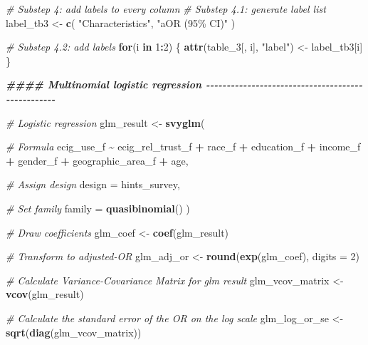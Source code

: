 \documentclass[
]{article}
\newenvironment{Shaded}{\begin{snugshade}}{\end{snugshade}}
\newcommand{\AttributeTok}[1]{\textcolor[rgb]{0.13,0.29,0.53}{#1}}
\newcommand{\CommentTok}[1]{\textcolor[rgb]{0.56,0.35,0.01}{\textit{#1}}}
\newcommand{\ControlFlowTok}[1]{\textcolor[rgb]{0.13,0.29,0.53}{\textbf{#1}}}
\newcommand{\DecValTok}[1]{\textcolor[rgb]{0.00,0.00,0.81}{#1}}
\newcommand{\DocumentationTok}[1]{\textcolor[rgb]{0.56,0.35,0.01}{\textbf{\textit{#1}}}}
\newcommand{\FunctionTok}[1]{\textcolor[rgb]{0.13,0.29,0.53}{\textbf{#1}}}
\newcommand{\NormalTok}[1]{#1}
\newcommand{\OtherTok}[1]{\textcolor[rgb]{0.56,0.35,0.01}{#1}}
\newcommand{\SpecialCharTok}[1]{\textcolor[rgb]{0.81,0.36,0.00}{\textbf{#1}}}
\newcommand{\StringTok}[1]{\textcolor[rgb]{0.31,0.60,0.02}{#1}}
\begin{document}
\begin{Shaded}
\begin{Highlighting}[]
\CommentTok{\# Substep 4: add labels to every column}
\CommentTok{\# Substep 4.1: generate label list}
\NormalTok{label\_tb3 }\OtherTok{\textless{}{-}} \FunctionTok{c}\NormalTok{(}
  \StringTok{"Characteristics"}\NormalTok{,}
  \StringTok{"aOR (95\% CI)"}
\NormalTok{)}

\CommentTok{\# Substep 4.2: add labels}
\ControlFlowTok{for}\NormalTok{(i }\ControlFlowTok{in} \DecValTok{1}\SpecialCharTok{:}\DecValTok{2}\NormalTok{) \{}
  \FunctionTok{attr}\NormalTok{(table\_3[, i], }\StringTok{"label"}\NormalTok{) }\OtherTok{\textless{}{-}}\NormalTok{ label\_tb3[i]}
\NormalTok{\}}




\DocumentationTok{\#\#\#\# Multinomial logistic regression {-}{-}{-}{-}{-}{-}{-}{-}{-}{-}{-}{-}{-}{-}{-}{-}{-}{-}{-}{-}{-}{-}{-}{-}{-}{-}{-}{-}{-}{-}{-}{-}{-}{-}{-}{-}{-}{-}{-}{-}{-}{-}{-}{-}{-}{-}{-}{-}{-}{-}}


\CommentTok{\# Logistic regression}
\NormalTok{glm\_result }\OtherTok{\textless{}{-}} \FunctionTok{svyglm}\NormalTok{(}
  
  \CommentTok{\# Formula}
\NormalTok{  ecig\_use\_f }\SpecialCharTok{\textasciitilde{}}\NormalTok{ ecig\_rel\_trust\_f }\SpecialCharTok{+}\NormalTok{ race\_f }\SpecialCharTok{+}\NormalTok{ education\_f }\SpecialCharTok{+}\NormalTok{ income\_f }\SpecialCharTok{+}\NormalTok{ gender\_f }\SpecialCharTok{+}\NormalTok{ geographic\_area\_f }\SpecialCharTok{+}\NormalTok{ age,}
  
  \CommentTok{\# Assign design}
  \AttributeTok{design =}\NormalTok{ hints\_survey,}
  
  \CommentTok{\# Set family}
  \AttributeTok{family =} \FunctionTok{quasibinomial}\NormalTok{()}
\NormalTok{)}


\CommentTok{\# Draw coefficients}
\NormalTok{glm\_coef }\OtherTok{\textless{}{-}} \FunctionTok{coef}\NormalTok{(glm\_result)}

\CommentTok{\# Transform to adjusted{-}OR}
\NormalTok{glm\_adj\_or }\OtherTok{\textless{}{-}} \FunctionTok{round}\NormalTok{(}\FunctionTok{exp}\NormalTok{(glm\_coef), }\AttributeTok{digits =} \DecValTok{2}\NormalTok{)}

\CommentTok{\# Calculate Variance{-}Covariance Matrix for glm result}
\NormalTok{glm\_vcov\_matrix }\OtherTok{\textless{}{-}} \FunctionTok{vcov}\NormalTok{(glm\_result)}

\CommentTok{\# Calculate the standard error of the OR on the log scale}
\NormalTok{glm\_log\_or\_se }\OtherTok{\textless{}{-}} \FunctionTok{sqrt}\NormalTok{(}\FunctionTok{diag}\NormalTok{(glm\_vcov\_matrix))}


\end{Highlighting}
\end{Shaded}
\end{document}
